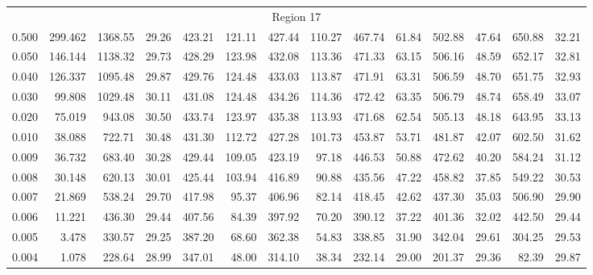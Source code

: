 \begin{tabular}{@{}lrrrrrrrrrrrrr@{}}
\midrule
\multicolumn{14}{c}{Region 17} \\
\cmidrule{1-14}
0.500 & 299.462 & 1368.55 & 29.26 & 423.21 & 121.11 & 427.44 & 110.27 & 467.74 & 61.84 & 502.88 & 47.64 & 650.88 & 32.21 \\
0.050 & 146.144 & 1138.32 & 29.73 & 428.29 & 123.98 & 432.08 & 113.36 & 471.33 & 63.15 & 506.16 & 48.59 & 652.17 & 32.81 \\
0.040 & 126.337 & 1095.48 & 29.87 & 429.76 & 124.48 & 433.03 & 113.87 & 471.91 & 63.31 & 506.59 & 48.70 & 651.75 & 32.93 \\
0.030 & 99.808 & 1029.48 & 30.11 & 431.08 & 124.48 & 434.26 & 114.36 & 472.42 & 63.35 & 506.79 & 48.74 & 658.49 & 33.07 \\
0.020 & 75.019 & 943.08 & 30.50 & 433.74 & 123.97 & 435.38 & 113.93 & 471.68 & 62.54 & 505.13 & 48.18 & 643.95 & 33.13 \\
0.010 & 38.088 & 722.71 & 30.48 & 431.30 & 112.72 & 427.28 & 101.73 & 453.87 & 53.71 & 481.87 & 42.07 & 602.50 & 31.62 \\
0.009 & 36.732 & 683.40 & 30.28 & 429.44 & 109.05 & 423.19 & 97.18 & 446.53 & 50.88 & 472.62 & 40.20 & 584.24 & 31.12 \\
0.008 & 30.148 & 620.13 & 30.01 & 425.44 & 103.94 & 416.89 & 90.88 & 435.56 & 47.22 & 458.82 & 37.85 & 549.22 & 30.53 \\
0.007 & 21.869 & 538.24 & 29.70 & 417.98 & 95.37 & 406.96 & 82.14 & 418.45 & 42.62 & 437.30 & 35.03 & 506.90 & 29.90 \\
0.006 & 11.221 & 436.30 & 29.44 & 407.56 & 84.39 & 397.92 & 70.20 & 390.12 & 37.22 & 401.36 & 32.02 & 442.50 & 29.44 \\
0.005 & 3.478 & 330.57 & 29.25 & 387.20 & 68.60 & 362.38 & 54.83 & 338.85 & 31.90 & 342.04 & 29.61 & 304.25 & 29.53 \\
0.004 & 1.078 & 228.64 & 28.99 & 347.01 & 48.00 & 314.10 & 38.34 & 232.14 & 29.00 & 201.37 & 29.36 & 82.39 & 29.87 \\

\bottomrule
\end{tabular}
